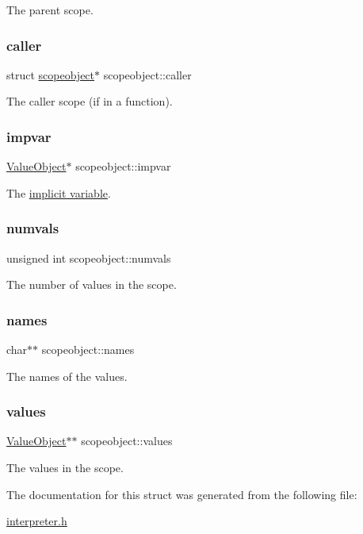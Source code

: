 The parent scope. \mbox{\label{structscopeobject_a279c4dacf326e1b913f69bcc5825896b}} 
\subsubsection{\texorpdfstring{caller}{caller}}
{\footnotesize\ttfamily struct \hyperlink{structscopeobject}{scopeobject}$\ast$ scopeobject\+::caller}

The caller scope (if in a function). \mbox{\label{structscopeobject_ae41fb9156685d42f9b30c1871603c87b}} 
\subsubsection{\texorpdfstring{impvar}{impvar}}
{\footnotesize\ttfamily \hyperlink{struct_value_object}{Value\+Object}$\ast$ scopeobject\+::impvar}

The \hyperlink{impvar}{implicit variable}. \mbox{\label{structscopeobject_af8cb43430f28df6a4935d53ec1ac470b}} 
\subsubsection{\texorpdfstring{numvals}{numvals}}
{\footnotesize\ttfamily unsigned int scopeobject\+::numvals}

The number of values in the scope. \mbox{\label{structscopeobject_a69981d4f863a3a236e052d8d7c911072}} 
\subsubsection{\texorpdfstring{names}{names}}
{\footnotesize\ttfamily char$\ast$$\ast$ scopeobject\+::names}

The names of the values. \mbox{\label{structscopeobject_a91d5a05990706ccd0dd32356fbb534ba}} 
\subsubsection{\texorpdfstring{values}{values}}
{\footnotesize\ttfamily \hyperlink{struct_value_object}{Value\+Object}$\ast$$\ast$ scopeobject\+::values}

The values in the scope. 

The documentation for this struct was generated from the following file\+:\begin{DoxyCompactItemize}
\item 
\hyperlink{interpreter_8h}{interpreter.\+h}\end{DoxyCompactItemize}
